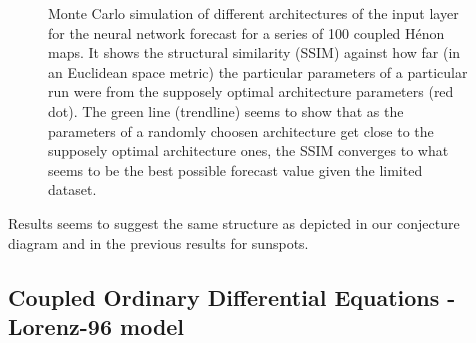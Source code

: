 \documentclass[journal]{IEEEtran}
\begin{document}
\begin{figure}[!ht]
\centering
{}
\caption{Monte Carlo simulation of different architectures of the input layer for the neural network forecast for a series of 100 coupled
H\'{e}non maps.
It shows the structural similarity (SSIM) against how far (in an Euclidean space metric) the particular parameters of a particular
run were from the supposely optimal architecture parameters (red dot). The green line (trendline) seems to show that as the parameters
of a randomly choosen architecture get close to the supposely optimal architecture ones, the SSIM converges to what seems to be the
best possible forecast value given the limited dataset.}
\label{MonteCarloSSIMversusParameterMetricDistance100HenonCoupledMaps}
\end{figure}

Results seems to suggest the same structure as depicted in our conjecture diagram and in the previous results for sunspots.

\subsection{Coupled Ordinary Differential Equations - Lorenz-96 model}

\end{document}
